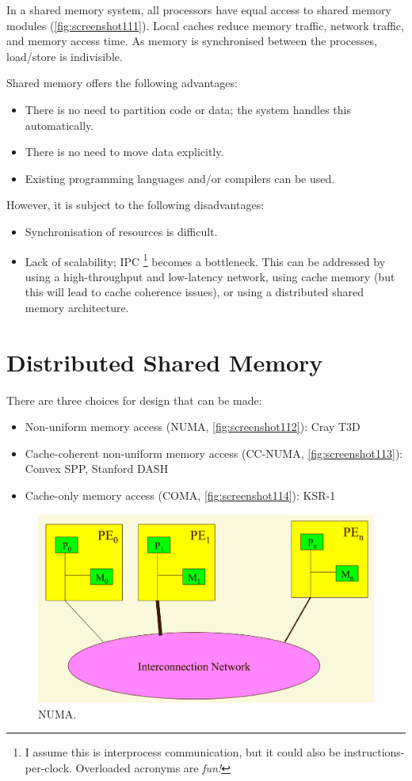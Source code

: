 In a shared memory system, all processors have equal access to shared memory modules (\autoref{fig:screenshot111}). Local caches reduce memory traffic, network traffic, and memory access time. As memory is synchronised between the processes, load/store is indivisible.

Shared memory offers the following advantages: \begin{itemize}
\item There is no need to partition code or data; the system handles this automatically.
\item There is no need to move data explicitly.
\item Existing programming languages and/or compilers can be used.
\end{itemize}

However, it is subject to the following disadvantages: \begin{itemize}
\item Synchronisation of resources is difficult.
\item Lack of scalability; IPC \footnote{I assume this is interprocess communication, but it could also be instructions-per-clock. Overloaded acronyms are \textit{fun!}} becomes a bottleneck. This can be addressed by using a high-throughput and low-latency network, using cache memory (but this will lead to cache coherence issues), or using a distributed shared memory architecture.
\end{itemize}

\section{Distributed Shared Memory}
There are three choices for design that can be made: \begin{itemize}
\item Non-uniform memory access (NUMA, \autoref{fig:screenshot112}): Cray T3D
\item Cache-coherent non-uniform memory access (CC-NUMA, \autoref{fig:screenshot113}): Convex SPP, Stanford DASH
\item Cache-only memory access (COMA, \autoref{fig:screenshot114}): KSR-1
\end{itemize}

\begin{figure}
\centering
\includegraphics[width=0.7\linewidth]{figures/screenshot112}
\caption{NUMA.}
\label{fig:screenshot112}
\end{figure}

